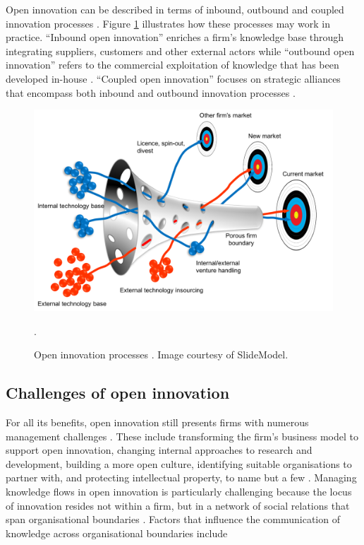 Open innovation can be described in terms of inbound, outbound and coupled innovation processes \citep{chesbrough2006beyond,enkel2009open,gassmann2010future}. Figure \ref{fig:oi_process} illustrates how these processes may work in practice. \enquote{Inbound open innovation} enriches a firm’s knowledge base through integrating suppliers, customers and other external actors \citep{xu2013inbound} while \enquote{outbound open innovation} refers to the commercial exploitation of knowledge that has been developed in-house \citep{de2016knowledge}. \enquote{Coupled open innovation} focuses on strategic alliances that encompass both inbound and outbound innovation processes \citep{spithoven2013open}. \medskip

\begin{figure}
	\centering
	\includegraphics[width=0.9\linewidth]{Images/oi_process}
	\caption{Open innovation processes \citep{chesbrough2004open}. Image courtesy of SlideModel.}.
	\label{fig:oi_process}
\end{figure}

\subsection{Challenges of open innovation}

For all its benefits, open innovation still presents firms with numerous management challenges \citep{hossain2013open,vanhaverbeke2014surfing}. These include transforming the firm's business model to support open innovation, changing internal approaches to research and development, building a more open culture, identifying suitable organisations to partner with, and protecting intellectual property, to name but a few \citep{dahlander2010open,sieg2010managerial,lichtenthaler2011your,durst2013success,roper2013externalities,aloini2016structured}. Managing knowledge flows in open innovation is particularly challenging because the locus of innovation resides not within a firm, but in a network of social relations that span organisational boundaries \citep{powell1996interorganizational,elmquist2009exploring}. Factors that influence the communication of knowledge across organisational boundaries include 

